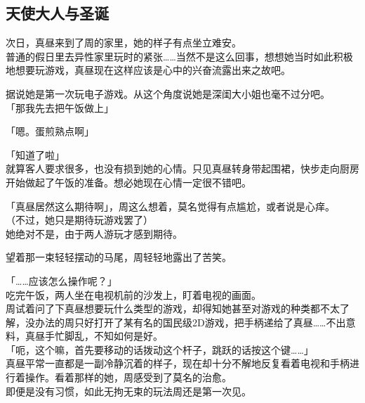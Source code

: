 \subsection{天使大人与圣诞}

次日，真昼来到了周的家里，她的样子有点坐立难安。\\

普通的假日里去异性家里玩时的紧张……当然不是这么回事，想想她当时如此积极地想要玩游戏，真昼现在这样应该是心中的兴奋流露出来之故吧。

据说她是第一次玩电子游戏。从这个角度说她是深闺大小姐也毫不过分吧。\\

「那我先去把午饭做上」

「嗯。蛋煎熟点啊」

「知道了啦」\\

就算客人要求很多，也没有损到她的心情。只见真昼转身带起围裙，快步走向厨房开始做起了午饭的准备。想必她现在心情一定很不错吧。

「真昼居然这么期待啊」，周这么想着，莫名觉得有点尴尬，或者说是心痒。\\

（不过，她只是期待玩游戏罢了）\\

她绝对不是，由于两人游玩才感到期待。

望着那一束轻轻摆动的马尾，周轻轻地露出了苦笑。\\

\vspace{2\baselineskip}

「……应该怎么操作呢？」\\

吃完午饭，两人坐在电视机前的沙发上，盯着电视的画面。\\

周试着问了下真昼想要玩什么类型的游戏，却得知她甚至对游戏的种类都不太了解，没办法的周只好打开了某有名的国民级2D游戏，把手柄递给了真昼……不出意料，真昼手忙脚乱，不知如何是好。\\

「呃，这个嘛，首先要移动的话拨动这个杆子，跳跃的话按这个键……」\\

真昼平常一直都是一副冷静沉着的样子，现在却十分不解地反复看着电视和手柄进行着操作。看着那样的她，周感受到了莫名的治愈。\\

即便是没有习惯，如此无拘无束的玩法周还是第一次见。\\

